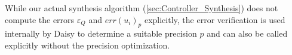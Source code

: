 While our actual synthesis algorithm (\autoref{sec:Controller_Synthesis}) does
not compute the errors $\varepsilon_Q$ and $err(u_{i})_{p}$ explicitly, the
error verification is used internally by Daisy to determine a suitable precision
$p$ and can also be called explicitly without the precision optimization.



